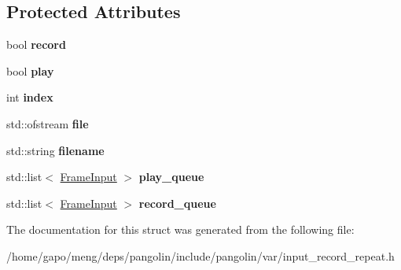 \subsection*{Protected Attributes}
\begin{DoxyCompactItemize}
\item 
bool {\bfseries record}\hypertarget{structpangolin_1_1_input_record_repeat_a1f63548705a399f0822fe7e9d169ffe1}{}\label{structpangolin_1_1_input_record_repeat_a1f63548705a399f0822fe7e9d169ffe1}

\item 
bool {\bfseries play}\hypertarget{structpangolin_1_1_input_record_repeat_ae6e3684d6237e1c326a29cd32f89625f}{}\label{structpangolin_1_1_input_record_repeat_ae6e3684d6237e1c326a29cd32f89625f}

\item 
int {\bfseries index}\hypertarget{structpangolin_1_1_input_record_repeat_a889dd65e62e50bfbc8ff1c1304d3abac}{}\label{structpangolin_1_1_input_record_repeat_a889dd65e62e50bfbc8ff1c1304d3abac}

\item 
std\+::ofstream {\bfseries file}\hypertarget{structpangolin_1_1_input_record_repeat_a4a360df06ee1a733c0312f1aa1fe7e09}{}\label{structpangolin_1_1_input_record_repeat_a4a360df06ee1a733c0312f1aa1fe7e09}

\item 
std\+::string {\bfseries filename}\hypertarget{structpangolin_1_1_input_record_repeat_a5633fa57616e7276201fadbd73675b7f}{}\label{structpangolin_1_1_input_record_repeat_a5633fa57616e7276201fadbd73675b7f}

\item 
std\+::list$<$ \hyperlink{structpangolin_1_1_frame_input}{Frame\+Input} $>$ {\bfseries play\+\_\+queue}\hypertarget{structpangolin_1_1_input_record_repeat_a0fdad6c5b32c4bad4fa3e5413d857f79}{}\label{structpangolin_1_1_input_record_repeat_a0fdad6c5b32c4bad4fa3e5413d857f79}

\item 
std\+::list$<$ \hyperlink{structpangolin_1_1_frame_input}{Frame\+Input} $>$ {\bfseries record\+\_\+queue}\hypertarget{structpangolin_1_1_input_record_repeat_a73adce0f3218524c899d8a9a56ec11e5}{}\label{structpangolin_1_1_input_record_repeat_a73adce0f3218524c899d8a9a56ec11e5}

\end{DoxyCompactItemize}


The documentation for this struct was generated from the following file\+:\begin{DoxyCompactItemize}
\item 
/home/gapo/meng/deps/pangolin/include/pangolin/var/input\+\_\+record\+\_\+repeat.\+h\end{DoxyCompactItemize}
